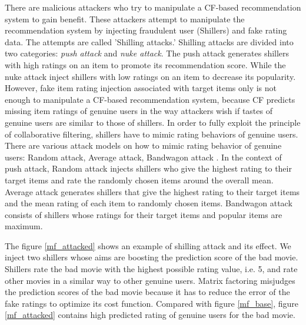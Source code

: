 \documentclass[master,english,final]{kaist-ucs}
\begin{document}
There are malicious attackers who try to manipulate a CF-based recommendation system to gain benefit.
These attackers attempt to manipulate the recommendation system by injecting fraudulent user (Shillers) and fake rating data.
The attempts are called 'Shilling attacks.'
Shilling attacks are divided into two categories: \textit{push attack} and \textit{nuke attack}.
The push attack generates shillers with high ratings on an item to promote its recommendation score.
While the nuke attack inject shillers with low ratings on an item to decrease its popularity.
However, fake item rating injection associated with target items only is not enough to manipulate a CF-based recommendation system, because CF predicts missing item ratings of genuine users in the way attackers wish if tastes of genuine users are similar to those of shillers.
In order to fully exploit the principle of collaborative filtering, shillers have to mimic rating behaviors of genuine users.
There are various attack models on how to mimic rating behavior of genuine users: Random attack, Average attack, Bandwagon attack \cite{shilling_attack_1,shilling_attack_2,shilling_attack_3,shilling_attack_guide}.
In the context of push attack, Random attack injects shillers who give the highest rating to their target items and rate the randomly chosen items around the overall mean.
Average attack generates shillers that give the highest rating to their target items and the mean rating of each item to randomly chosen items.
Bandwagon attack consists of shillers whose ratings for their target items and popular items are maximum.

The figure \ref{mf_attacked} shows an example of shilling attack and its effect. We inject two shillers whose aims are boosting the prediction score of the bad movie.
Shillers rate the bad movie with the highest possible rating value, i.e. 5, and rate other movies in a similar way to other genuine users.
Matrix factoring misjudges the prediction scores of the bad movie because it has to reduce the error of the fake ratings to optimize its cost function.
Compared with figure \ref{mf_base}, figure \ref{mf_attacked} contains high predicted rating of genuine users for the bad movie.
\end{document}
